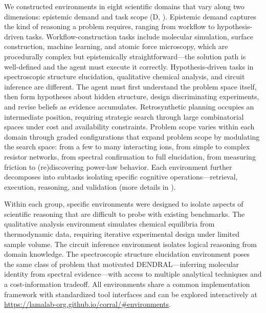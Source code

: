 We constructed environments in eight scientific domains that vary along two dimensions: epistemic demand and task scope (D, ). 
Epistemic demand captures the kind of reasoning a problem requires, ranging from workflow to hypothesis-driven tasks. Workflow-construction tasks include molecular simulation, surface construction, machine learning, and atomic force microscopy, which are procedurally complex but epistemically straightforward---the solution path is well-defined and the agent must execute it correctly. Hypothesis-driven tasks in spectroscopic structure elucidation, qualitative chemical analysis, and circuit inference are different. The agent must first understand the problem space itself, then form hypotheses about hidden structure, design discriminating experiments, and revise beliefs as evidence accumulates. Retrosynthetic planning occupies an intermediate position, requiring strategic search through large combinatorial spaces under cost and availability constraints. Problem scope varies within each domain through graded configurations that expand problem scope by modulating the search space: from a few to many interacting ions, from simple to complex resistor networks, from spectral confirmation to full elucidation, from measuring friction to (re)discovering power-law behavior. 
Each environment further decomposes into subtasks isolating specific cognitive operations---retrieval, execution, reasoning, and validation (more details in ).

Within each group, specific environments were designed to isolate aspects of scientific reasoning that are difficult to probe with existing benchmarks. The qualitative analysis environment simulates chemical equilibria from thermodynamic data, requiring iterative experimental design under limited sample volume. The circuit inference environment isolates logical reasoning from domain knowledge. The spectroscopic structure elucidation environment poses the same class of problem that motivated DENDRAL---inferring molecular identity from spectral evidence---with access to multiple analytical techniques and a cost-information tradeoff. 
All environments share a common implementation framework with standardized tool interfaces and can be explored interactively at \url{https://lamalab-org.github.io/corral/#environments}.

